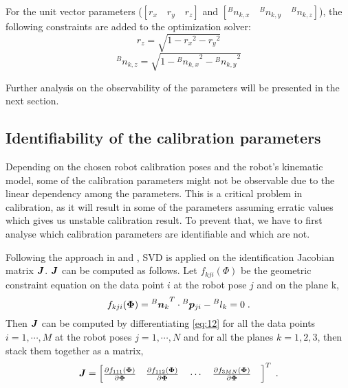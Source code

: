 For the unit vector parameters ($[r_x \quad r_y \quad r_z ]$ and  $[{^B}n_{k,x} \quad {^B}n_{k,y} \quad {^B}n_{k,z}]$), the following constraints are added to the optimization solver:
\begin{equation}
\label{eq:10}
{r_z} = \sqrt{1 - {r_x}^2 - {r_y}^2}
\end{equation}
\begin{equation}
\label{eq:11}
{^B}n_{k,z} = \sqrt{1 - {{^B}n_{k,x}}^2 - {{^B}n_{k,y}}^2}
\end{equation}

Further analysis on the observability of the parameters will be presented in the next section. 




\subsection{Identifiability of the calibration parameters}
\label{sec:third_step}

Depending on the chosen robot calibration poses and the robot's kinematic model, some of the calibration parameters might not be observable due to the linear dependency among the parameters. This is a critical problem in calibration, as it will result in some of the parameters assuming erratic values which gives us unstable calibration result. To prevent that, we have to first analyse which calibration parameters are identifiable and which are not. 

Following the approach in \cite{Joubair2015} and \cite{Hollerbach1996}, SVD is applied on the identification Jacobian matrix $\vb*{J}$. $\vb*{J}$ can be computed as follows. Let  $f_{kji}(\Phi)$ be the geometric constraint equation on the data point $i$ at the robot pose $j$ and on the plane k, 
\begin{equation}
\label{eq:12}
 f_{kji}(\vb*{\Phi}) =  {{^B}\vb*{n}_k}^T \cdot {^B}\vb*{p}_{ji} - {^B}l_k = 0 \; .
\end{equation}
Then $\vb*{J}$ can be computed by differentiating \eqref{eq:12} for all the data points $i = 1, \cdots, M$ at the robot poses $j = 1, \cdots, N$ and for all the planes $k=1,2,3$, then stack them together as a matrix,
\renewcommand\arraystretch{1.5}
\begin{equation}
\vb*{J} = \begin{bmatrix}
 \frac{\partial f_{111}(\vb*{\Phi})}{\partial\vb*{\Phi}} \quad
 \frac{\partial f_{112}(\vb*{\Phi})}{\partial\vb*{\Phi}} \quad
 \cdots  \quad
 \frac{\partial f_{3MN}(\vb*{\Phi})}{\partial\vb*{\Phi}} \quad
	\end{bmatrix} ^T \; .
\end{equation}

